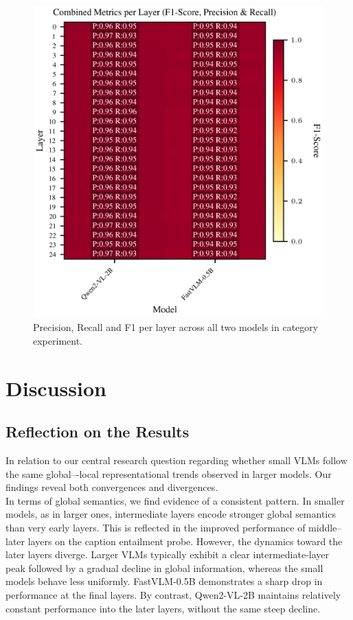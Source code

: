 \documentclass[11pt]{article}
\begin{document}
\begin{figure}[H]
    \centering
    \includegraphics[width=1\linewidth]{figures/local/_combined_exp2/combined_metrics_heatmap.png}
    \caption{Precision, Recall and F1 per layer across all two models in category experiment.}
    \label{fig:combined_metrics_per_layer_local}
\end{figure}


\section{Discussion}
\subsection{Reflection on the Results}
In relation to our central research question regarding whether small VLMs follow the same global–-local representational trends observed in larger models.
Our findings reveal both convergences and divergences.\\

In terms of global semantics, we find evidence of a consistent pattern.
In smaller models, as in larger ones, intermediate layers encode stronger global semantics than very early layers.
This is reflected in the improved performance of middle–later layers on the caption entailment probe. However, the dynamics toward the later layers diverge. Larger VLMs typically exhibit a clear intermediate-layer peak followed by a gradual decline in global information, whereas the small models behave less uniformly.
FastVLM-0.5B demonstrates a sharp drop in performance at the final layers.
By contrast, Qwen2-VL-2B maintains relatively constant performance into the later layers, without the same steep decline.\\
\end{document}
